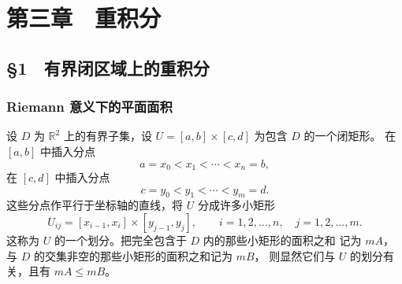 
\newcommand{\red}[1]{\textcolor[rgb]{1.00,0.00,0.00}{#1}}
\newcommand{\blue}[1]{\textcolor[rgb]{0.00,0.00,1.00}{#1}}
\newcommand{\green}[1]{\textcolor[rgb]{0.00,1.00,0.00}{#1}}
\newcommand{\darkblue}[1]
{\textcolor[rgb]{0.00,0.00,0.50}{#1}}
\newcommand{\darkgreen}[1]
{\textcolor[rgb]{0.00,0.37,0.00}{#1}}
\newcommand{\darkred}[1]{\textcolor[rgb]{0.60,0.00,0.00}{#1}}
\newcommand{\brown}[1]{\textcolor[rgb]{0.50,0.30,0.00}{#1}}
\newcommand{\purple}[1]{\textcolor[rgb]{0.50,0.00,0.50}{#1}}


\newcommand{\R}{\mathbb{R}}
\newcommand{\C}{\mathbb{C}}
\newcommand{\Z}{\mathbb{Z}}
\newcommand{\N}{\mathbb{N}}
\newcommand{\Q}{\mathbb{Q}}
\newcommand{\E}{\mathbb{E}}
\newcommand{\dd}{\mathrm{d}}
\newcommand{\eps}{\varepsilon}
\newcommand{\abs}[1]{\left| #1 \right|}
\newcommand{\norm}[1]{\left\| #1 \right\|}
\newcommand{\bkt}[1]{\left\langle #1 \right\rangle}
\newcommand{\F}{\mathbb{F}}

\newcommand{\dif}{\mathop{}\!\mathrm{d}}
\newcommand{\parder}[2]{\frac{\partial #1}{\partial #2}}
\newcommand{\vect}[1]{\boldsymbol{#1}}
\newcommand{\x}{\boldsymbol{x}}
\newcommand{\y}{\boldsymbol{y}}
\newcommand{\z}{\boldsymbol{z}}
\newcommand{\T}{\mathcal{T}}
\newcommand{\X}{\mathrm{X}}
\newcommand{\Y}{\mathrm{Y}}
\newcommand{\B}{\mathcal{B}}
\chapter*{第三章　重积分}




\section*{§1　有界闭区域上的重积分}

\subsection*{Riemann 意义下的平面面积}

设 $D$ 为 $\R^2$ 上的有界子集，设
$U=[a,b]\times[c,d]$ 为包含 $D$ 的一个闭矩形。
在 $[a,b]$ 中插入分点
\[
a=x_0<x_1<\cdots<x_n=b,
\]
在 $[c,d]$ 中插入分点
\[
c=y_0<y_1<\cdots<y_m=d.
\]
这些分点作平行于坐标轴的直线，将 $U$ 分成许多小矩形
\[
U_{ij}=[x_{i-1},x_i]\times[y_{j-1},y_j],
\qquad i=1,2,\ldots,n,\quad j=1,2,\ldots,m.
\]
这称为 $U$ 的一个划分。把完全包含于 $D$ 内的那些小矩形的面积之和
记为 $mA$，与 $D$ 的交集非空的那些小矩形的面积之和记为 $mB$，
则显然它们与 $U$ 的划分有关，且有 $mA\le mB$。


